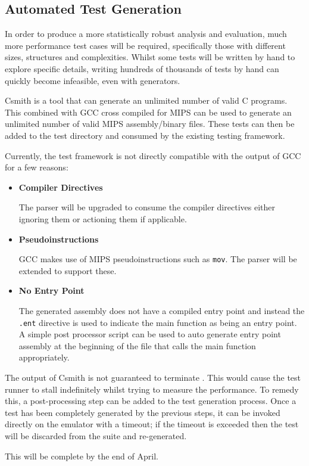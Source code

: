 \subsection{Automated Test Generation}

In order to produce a more statistically robust analysis and evaluation, much more performance test cases will be required, specifically those with different sizes, structures and complexities. Whilst some tests will be written by hand to explore specific details, writing hundreds of thousands of tests by hand can quickly become infeasible, even with generators.

Csmith \cite{csmith} is a tool that can generate an unlimited number of valid C programs. This combined with GCC \cite{gcc} cross compiled for MIPS \cite{mips-gcc} can be used to generate an unlimited number of valid MIPS assembly/binary files. These tests can then be added to the test directory and consumed by the existing testing framework.

Currently, the test framework is not directly compatible with the output of GCC for a few reasons:

\begin{itemize}
    \item \textbf{Compiler Directives}
    
    The parser will be upgraded to consume the compiler directives either ignoring them or actioning them if applicable.

    \item \textbf{Pseudoinstructions}
    
    GCC makes use of MIPS pseudoinstructions such as \texttt{mov}. The parser will be extended to support these.

    \item \textbf{No Entry Point}
    
    The generated assembly does not have a compiled entry point and instead the \texttt{.ent} directive is used to indicate the main function as being an entry point. A simple post processor script can be used to auto generate entry point assembly at the beginning of the file that calls the main function appropriately.
\end{itemize}

The output of Csmith is not guaranteed to terminate \cite{csmith-paper}. This would cause the test runner to stall indefinitely whilst trying to measure the performance. To remedy this, a post-processing step can be added to the test generation process. Once a test has been completely generated by the previous steps, it can be invoked directly on the emulator with a timeout; if the timeout is exceeded then the test will be discarded from the suite and re-generated.

This will be complete by the end of April.